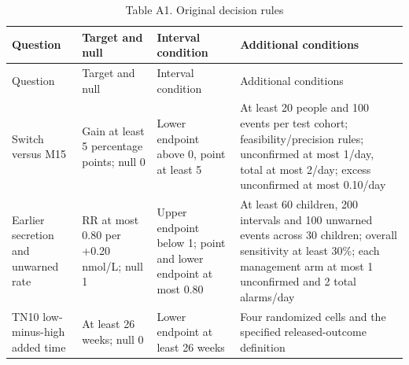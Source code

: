 \documentclass[
  american,
  11pt,
  letterpaper,
]{article}
\begin{document}
\Needspace{4.4in}
\begin{longtable}[]{@{}
  >{\raggedright\arraybackslash}p{}
  >{\raggedright\arraybackslash}p{}
  >{\raggedright\arraybackslash}p{}
  >{\raggedright\arraybackslash}p{}@{}}
\caption{Table A1. Original decision rules}\tabularnewline
\toprule\noalign{}
\begin{minipage}[b]{\linewidth}\raggedright
Question
\end{minipage} & \begin{minipage}[b]{\linewidth}\raggedright
Target and null
\end{minipage} & \begin{minipage}[b]{\linewidth}\raggedright
Interval condition
\end{minipage} & \begin{minipage}[b]{\linewidth}\raggedright
Additional conditions
\end{minipage} \\
\midrule\noalign{}
\endfirsthead
\toprule\noalign{}
\begin{minipage}[b]{\linewidth}\raggedright
Question
\end{minipage} & \begin{minipage}[b]{\linewidth}\raggedright
Target and null
\end{minipage} & \begin{minipage}[b]{\linewidth}\raggedright
Interval condition
\end{minipage} & \begin{minipage}[b]{\linewidth}\raggedright
Additional conditions
\end{minipage} \\
\midrule\noalign{}
\endhead
\bottomrule\noalign{}
\endlastfoot
Switch versus M15 & Gain at least 5 percentage points; null 0 & Lower
endpoint above 0, point at least 5 & At least 20 people and 100 events
per test cohort; feasibility/precision rules; unconfirmed at most 1/day,
total at most 2/day; excess unconfirmed at most 0.10/day \\
Earlier secretion and unwarned rate & RR at most 0.80 per +0.20 nmol/L;
null 1 & Upper endpoint below 1; point and lower endpoint at most 0.80 &
At least 60 children, 200 intervals and 100 unwarned events across 30
children; overall sensitivity at least 30\%; each management arm at most
1 unconfirmed and 2 total alarms/day \\
TN10 low-minus-high added time & At least 26 weeks; null 0 & Lower
endpoint at least 26 weeks & Four randomized cells and the specified
released-outcome definition \\
\end{longtable}
\end{document}
